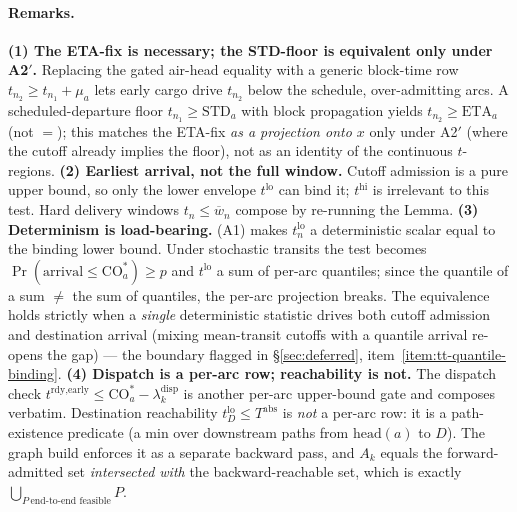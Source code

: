 \documentclass[11pt,a4paper]{article}
\theoremstyle{definition}
\begin{document}
\paragraph{Remarks.}
\textbf{(1) The ETA-fix is necessary; the STD-floor is equivalent only under
A2$'$.} Replacing the gated air-head equality with a generic block-time row
$t_{n_2} \geq t_{n_1} + \mu_a$ lets early cargo drive $t_{n_2}$ below the
schedule, over-admitting arcs. A scheduled-departure floor $t_{n_1} \geq
\text{STD}_a$ with block propagation yields $t_{n_2} \geq \text{ETA}_a$ (not
$=$); this matches the ETA-fix \emph{as a projection onto $x$} only under A2$'$
(where the cutoff already implies the floor), not as an identity of the
continuous $t$-regions. \textbf{(2) Earliest arrival, not the full window.}
Cutoff admission is a pure upper bound, so only the lower envelope
$t^{\text{lo}}$ can bind it; $t^{\text{hi}}$ is irrelevant to this test. Hard
delivery windows $t_n \leq \overline{w}_n$ compose by re-running the Lemma.
\textbf{(3) Determinism is load-bearing.} (A1) makes $t^{\text{lo}}_n$ a
deterministic scalar equal to the binding lower bound. Under stochastic
transits the test becomes $\Pr(\text{arrival} \leq \text{CO}_a^*) \geq p$ and
$t^{\text{lo}}$ a sum of per-arc quantiles; since the quantile of a sum $\neq$
the sum of quantiles, the per-arc projection breaks. The equivalence holds
strictly when a \emph{single} deterministic statistic drives both cutoff
admission and destination arrival (mixing mean-transit cutoffs with a
quantile arrival re-opens the gap) --- the boundary flagged in
\S\ref{sec:deferred}, item~\ref{item:tt-quantile-binding}.
\textbf{(4) Dispatch is a per-arc row; reachability is not.} The dispatch
check $t^{\text{rdy,early}} \leq \text{CO}_a^* - \lambda^{\text{disp}}_k$ is
another per-arc upper-bound gate and composes verbatim. Destination
reachability $t^{\text{lo}}_{D} \leq T^{\text{abs}}$ is \emph{not} a per-arc
row: it is a path-existence predicate (a min over downstream paths from
$\text{head}(a)$ to $D$). The graph build enforces it as a separate backward
pass, and $A_k$ equals the forward-admitted set \emph{intersected with} the
backward-reachable set, which is exactly $\bigcup_{P\ \text{end-to-end feasible}} P$.
\end{document}
